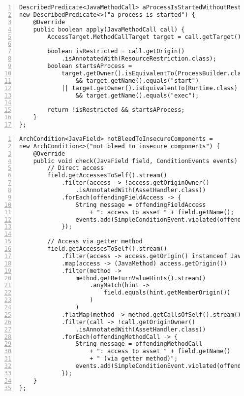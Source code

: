 \begin{lstlisting}[caption=Constraint 5: \texttt{aProcessIsStartedWithoutRestriction} custom predicate., captionpos=b, label=lst:constraint_5_predicate_2, numbers=left, showstringspaces=false]
DescribedPredicate<JavaMethodCall> aProcessIsStartedWithoutRestriction =
new DescribedPredicate<>("a process is started") {
    @Override
    public boolean apply(JavaMethodCall call) {
        AccessTarget.MethodCallTarget target = call.getTarget();

        boolean isRestricted = call.getOrigin()
            .isAnnotatedWith(ResourceRestriction.class);
        boolean startsAProcess =
            target.getOwner().isEquivalentTo(ProcessBuilder.class)
                && target.getName().equals("start")
            || target.getOwner().isEquivalentTo(Runtime.class)
                && target.getName().equals("exec");

        return !isRestricted && startsAProcess;
    }
};
\end{lstlisting}

\clearpage
\begin{lstlisting}[caption=Constraint 6: \texttt{notBleedToInsecureComponents} custom condition., captionpos=b, label=lst:constraint_6_condition, numbers=left, showstringspaces=false]
ArchCondition<JavaField> notBleedToInsecureComponents =
new ArchCondition<>("not bleed to insecure components") {
    @Override
    public void check(JavaField field, ConditionEvents events) {
        // Direct access
        field.getAccessesToSelf().stream()
            .filter(access -> !access.getOriginOwner()
                .isAnnotatedWith(AssetHandler.class))
            .forEach(offendingFieldAccess -> {
                String message = offendingFieldAccess
                    + ": access to asset " + field.getName();
                events.add(SimpleConditionEvent.violated(offendingFieldAccess, message));
            });

        // Access via getter method
        field.getAccessesToSelf().stream()
            .filter(access -> access.getOrigin() instanceof JavaMethod)
            .map(access -> (JavaMethod) access.getOrigin())
            .filter(method ->
                method.getReturnValueHints().stream()
                    .anyMatch(hint ->
                        field.equals(hint.getMemberOrigin())
                    )
                )
            .flatMap(method -> method.getCallsOfSelf().stream())
            .filter(call -> !call.getOriginOwner()
                .isAnnotatedWith(AssetHandler.class))
            .forEach(offendingMethodCall -> {
                String message = offendingMethodCall
                    + ": access to asset " + field.getName()
                    + " (via getter method)";
                events.add(SimpleConditionEvent.violated(offendingMethodCall, message));
            });
    }
};
\end{lstlisting}

